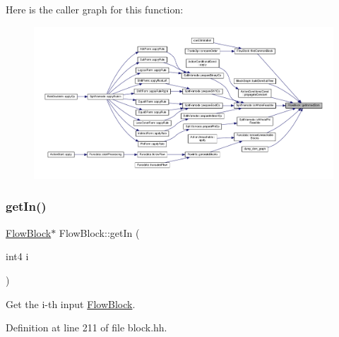 Here is the caller graph for this function\+:
\nopagebreak
\begin{figure}[H]
\begin{center}
\leavevmode
\includegraphics[width=350pt]{class_flow_block_a4b223b939cafc0405323dd0d6dc749d6_icgraph}
\end{center}
\end{figure}
\mbox{\label{class_flow_block_acbb1f895710c8339bd21d9c7a3200322}} 
\subsubsection{\texorpdfstring{getIn()}{getIn()}\hspace{0.1cm}{\footnotesize\ttfamily [1/2]}}
{\footnotesize\ttfamily \mbox{\hyperlink{class_flow_block}{Flow\+Block}}$\ast$ Flow\+Block\+::get\+In (\begin{DoxyParamCaption}\item[{int4}]{i }\end{DoxyParamCaption})\hspace{0.3cm}{\ttfamily [inline]}}



Get the i-\/th input \mbox{\hyperlink{class_flow_block}{Flow\+Block}}. 



Definition at line 211 of file block.\+hh.

